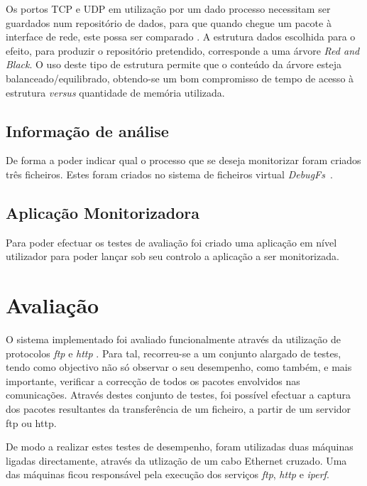 \documentclass[a4paper]{llncs}
\newcommand{\td}[1]{\todo[inline]{#1}}
\begin{document}
Os portos TCP e UDP em utilização por um dado processo necessitam ser guardados num repositório de dados, para que quando chegue um pacote à interface de rede, este possa ser comparado \td{explicação um pouco mais detalhada}. A estrutura dados escolhida para o efeito, para produzir o repositório pretendido, corresponde a uma árvore \textit{Red and Black}. O uso deste tipo de estrutura permite que o conteúdo da árvore esteja balanceado/equilibrado, obtendo-se um bom compromisso de tempo de acesso à estrutura \textit{versus} quantidade de memória utilizada.

\subsection*{Informação de análise}
\label{sub:data_information}

De forma a poder indicar qual o processo que se deseja monitorizar foram criados três ficheiros. Estes foram criados no sistema de ficheiros virtual \textit{DebugFs}~\cite{DebugFs}.

\subsection{Aplicação Monitorizadora}
\label{sub:monitor_app}
Para poder efectuar os testes de avaliação foi criado uma aplicação em nível utilizador para poder lançar sob seu controlo a aplicação a ser monitorizada.

\section{Avaliação}
\label{sec:evaluation}
O sistema implementado foi avaliado funcionalmente através da utilização de protocolos \textit{ftp}\cite{ftp-proto} e \textit{http} \cite{HypTraPro--HTT}. Para tal, recorreu-se a um conjunto alargado de testes, tendo como objectivo não só observar o seu desempenho, como também, e mais importante, verificar a correcção de todos os pacotes envolvidos nas comunicações. Através destes conjunto de testes, foi possível efectuar a captura dos pacotes resultantes da transferência de um ficheiro, a partir de um servidor ftp ou http. 

De modo a realizar estes testes de desempenho, foram utilizadas duas máquinas ligadas directamente, através da utlização de um cabo Ethernet cruzado. Uma das máquinas ficou responsável pela execução dos serviços \textit{ftp}, \textit{http} e \textit{iperf}.
\end{document}
